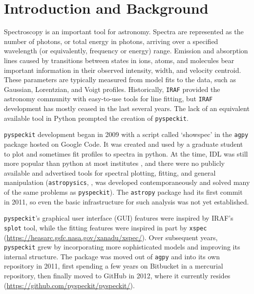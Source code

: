 \documentclass[twocolumn,linenumbers]{aastex63}
\newcommand{\pyspeckit}{\texttt{pyspeckit}\xspace}
\newcommand{\astropy}{\texttt{astropy}\xspace}
\begin{document}
\section{Introduction and Background}
Spectroscopy is an important tool for astronomy. Spectra are represented as
the number of photons, or total energy in photons, arriving over a specified
wavelength (or equivalently, frequency or energy) range. Emission and
absorption lines caused by transitions between states in ions, atoms, and molecules bear important information
in their observed intensity, width, and velocity centroid. These parameters are
typically measured from model fits to the data, such as Gaussian, Lorentzian,
and Voigt profiles. Historically, \texttt{IRAF} \citep{iraf} provided the astronomy
community with easy-to-use tools for line fitting, but \texttt{IRAF}
development has mostly ceased in the last several years.
The lack of an equivalent available
tool in Python prompted the creation of \pyspeckit.


\pyspeckit development began in 2009 with a script called `showspec' in the
\texttt{agpy} package hosted on Google Code. It was created and used by a
graduate student to plot and sometimes fit profiles to spectra in python. At
the time, IDL was still more popular than python at most institutes
\citep[the first evidence
that python had overtaken IDL in popularity among astronomers was presented in
][]{Momcheva2015a}, and there were no publicly available and advertised
tools for spectral plotting, fitting, and general manipulation
(\texttt{astropysics}, \citealt{Tollerud2012a}, was developed contemporaneously and
solved many of the same problems as \pyspeckit). The \astropy package
\citep{AstropyCollaboration2013,AstropyCollaboration2018} had its first commit in
2011, so even the basic infrastructure for such analysis was
not yet established.

\pyspeckit's graphical user interface (GUI) features were inspired by IRAF's
\texttt{splot} tool, while the fitting features were inspired in part by \texttt{xspec}
(\url{https://heasarc.gsfc.nasa.gov/xanadu/xspec/}).  Over subsequent years,
\pyspeckit grew by incorporating more sophisticated models  and improving its
internal structure.  The package was moved out of \texttt{agpy} and into its
own repository in 2011, first spending a few years on Bitbucket in a mercurial
repository, then finally moved to GitHub in 2012, where it currently resides (\url{https://github.com/pyspeckit/pyspeckit/}).
\end{document}
